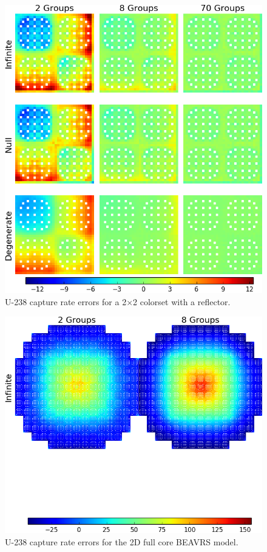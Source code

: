 \begin{figure}[h!]
\centering
\includegraphics[width=\linewidth]{figures/quantification/reflector/capt-err}
\caption[U-238 capture rate errors for a 2$\times$2 colorset with a reflector]{U-238 capture rate errors for a 2$\times$2 colorset with a reflector.}
\label{fig:chap8-reflector-capt-err}
\end{figure}

\begin{figure}[h!]
\centering
\includegraphics[width=\linewidth]{figures/quantification/full-core/capt-err}
\caption[U-238 capture rate errors for the 2D full core \ac{BEAVRS} model]{U-238 capture rate errors for the 2D full core \ac{BEAVRS} model.}
\label{fig:chap8-full-core-capt-err}
\end{figure}


